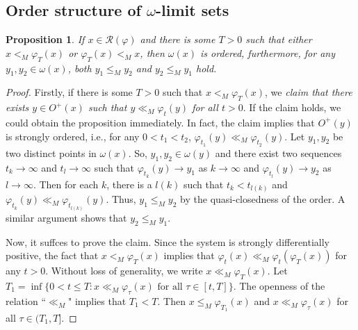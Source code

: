 \documentclass[a4paper,11pt]{article}
\theoremstyle{plain}
\newtheorem{prop}[thm]{Proposition}
\theoremstyle{definition}
\numberwithin{equation}{section}
\begin{document}
    
\subsection{Order structure of $\omega$-limit sets}\label{s3.1}	
	
	
\begin{prop}\label{pseudoorder-orbit}
	If $x\in \mathcal{R}(\varphi)$ and there is some $T>0$ such that either $x<_M \varphi_T(x)$ or $\varphi_T(x)<_M x$, then $\omega(x)$ is ordered, furthermore, for any $y_1, y_2 \in \omega(x)$, both $y_1\leq_M y_2$ and $y_2\leq_M y_1$ hold. 
\end{prop}
	
\begin{proof}
	Firstly, if there is some $T>0$ such that $x<_M \varphi_T(x)$, we {\it claim that there exists $y\in O^{+}(x)$ such that $y\ll_M \varphi_{t}(y)$ for all $t>0$}. If the claim holds, we could obtain the proposition immediately. In fact, the claim implies that $O^{+}(y)$ is strongly ordered, i.e., for any $0<t_1<t_2$, $\varphi_{t_1}(y)\ll_M \varphi_{t_2}(y)$. Let $y_1, y_2$ be two distinct points in $\omega(x)$. So, $y_1, y_2 \in \omega(y)$ and there exist two sequences $t_k \to \infty$ and $t_l \to \infty$ such that $\varphi_{t_k}(y)\to y_1$ as $k\to \infty$ and $\varphi_{t_l}(y)\to y_2$ as $l\to \infty$. Then for each $k$, there is a $l(k)$ such that $t_k<t_{l(k)}$ and $\varphi_{t_k}(y)\ll_M \varphi_{t_{l(k)}}(y)$. Thus, $y_1\leq_M y_2$ by the quasi-closedness of the order. A similar argument shows that $y_2\leq_M y_1$.
	
		
	Now, it suffces to prove the claim.	Since the system is strongly differentially positive, the fact that $x<_M \varphi_T(x)$ implies that $\varphi_{t}(x)\ll_M \varphi_{t}(\varphi_T(x))$ for any $t>0$. Without loss of generality, we write $x\ll_M \varphi_T(x)$. Let $T_1=\inf \{0 < t \leq T \colon x\ll_M \varphi_{\tau}(x) \text{ for all } \tau\in [t,T] \}$. The openness of the relation ``$\ll_M$" implies that $T_1<T$. Then $x\leq_M \varphi_{T_1}(x)$ and $x\ll_M \varphi_{\tau}(x)$ for all $\tau\in (T_1,T]$.
		

\end{proof}
\end{document}
